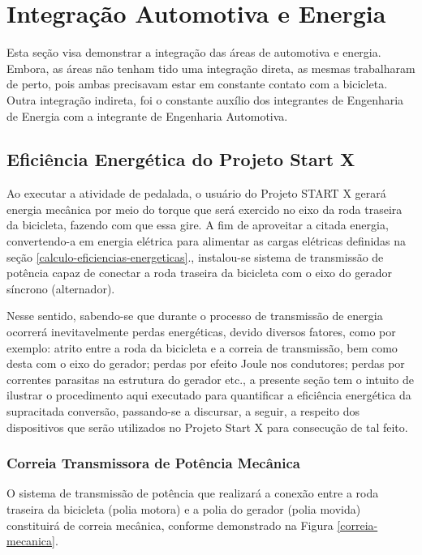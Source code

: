 \section{Integração Automotiva e Energia}

Esta seção visa demonstrar a integração das áreas de automotiva e energia. Embora, as áreas não tenham tido uma integração direta, as mesmas trabalharam de perto, pois ambas precisavam estar em constante contato com a bicicleta. Outra integração indireta, foi o constante auxílio dos integrantes de Engenharia de Energia com a integrante de Engenharia Automotiva.

\subsection{Eficiência Energética do Projeto Start X}

Ao executar a atividade de pedalada, o usuário do Projeto START X gerará energia mecânica por meio do torque que será exercido no eixo da roda traseira da bicicleta, fazendo com que essa gire. A fim de aproveitar a citada energia, convertendo-a em energia elétrica para alimentar as cargas elétricas definidas na seção \ref{calculo-eficiencias-energeticas}., instalou-se sistema de transmissão de potência capaz de conectar a roda traseira da bicicleta com o eixo do gerador síncrono (alternador).

Nesse sentido, sabendo-se que durante o processo de transmissão de energia ocorrerá inevitavelmente perdas energéticas, devido diversos fatores, como por exemplo: atrito entre a roda da bicicleta e a correia de transmissão, bem como desta com o eixo do gerador; perdas por efeito Joule nos condutores; perdas por correntes parasitas na estrutura do gerador etc., a presente seção tem o intuito de ilustrar o procedimento aqui executado para quantificar a eficiência energética da supracitada conversão, passando-se a discursar, a seguir, a respeito dos dispositivos que serão utilizados no Projeto Start X para consecução de tal feito.

\subsubsection{Correia Transmissora de Potência Mecânica}

O sistema de transmissão de potência que realizará a conexão entre a roda traseira da bicicleta (polia motora) e a polia do gerador (polia movida) constituirá de correia mecânica, conforme demonstrado na Figura \ref{correia-mecanica}.

